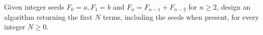 Given integer seeds $F_0=a,F_1=b$ and $F_n=F_{n-1}+F_{n-2}$ for $n\ge2$, design an algorithm returning the first $N$ terms, including the seeds when present, for every integer $N\ge0$.

